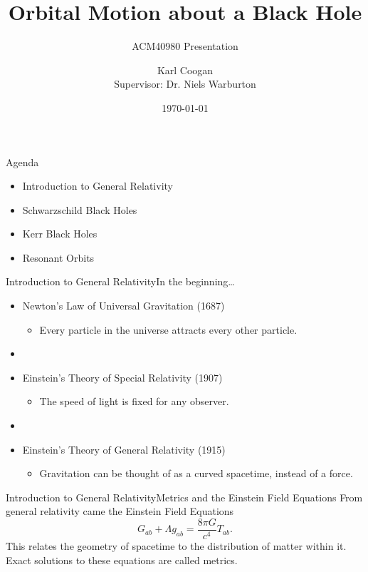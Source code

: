 \documentclass[12pt]{beamer}
\title{Orbital Motion about a Black Hole}
\subtitle{ACM40980 Presentation}
\author[Karl Coogan]{Karl Coogan\\[10mm]{Supervisor: Dr. Niels Warburton}}
\date{\today}
\begin{document}
\maketitle

\begin{frame}{Agenda}
\begin{itemize}
    \item Introduction to General Relativity
    \item Schwarzschild Black Holes
    \item Kerr Black Holes
    \item \alert<2>{Resonant Orbits}
\end{itemize}
\end{frame}

\begin{frame}{Introduction to General Relativity}{In the beginning\ldots}
\begin{itemize}
    \item[] Newton's Law of Universal Gravitation (1687)
    \begin{itemize}
        \item Every particle in the universe attracts every other particle.
    \end{itemize}
    \item[]
    \item[] Einstein's Theory of Special Relativity (1907)
    \begin{itemize}
        \item The speed of light is fixed for any observer.
    \end{itemize}
    \item[]
    \item[] Einstein's Theory of General Relativity (1915)
    \begin{itemize}
        \item Gravitation can be thought of as a curved spacetime, instead of a force.
    \end{itemize}
\end{itemize}
\end{frame}

\begin{frame}{Introduction to General Relativity}{Metrics and the Einstein Field Equations}
From general relativity came the Einstein Field Equations
\begin{equation}
    G_{ab}+\Lambda g_{ab}=\frac{8\pi G}{c^4}T_{ab}.
\end{equation}
This relates the geometry of spacetime to the distribution of matter within it.\\
\vskip10pt
Exact solutions to these equations are called metrics.
\end{frame}
\end{document}

